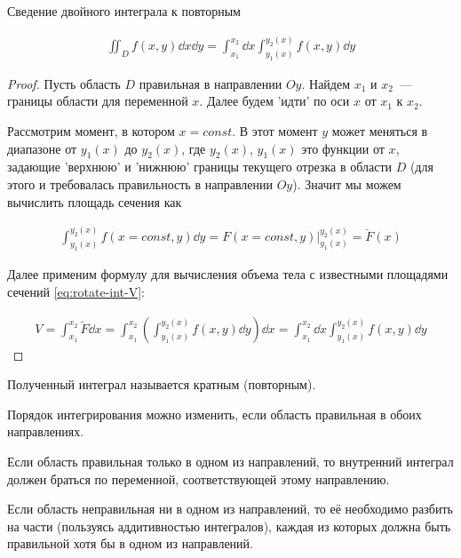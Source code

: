 
\begin{theorem}\label{iint-to-rep}
  Сведение двойного интеграла к повторным

  \begin{align*}
    \iint_{D} f(x, y) \dd x \dd y =
      \int_{x_{1}}^{x_{2}} \dd x \int_{y_{1}(x)}^{y_{2}(x)} f(x, y) \dd y
  \end{align*}
\end{theorem}
\begin{proof}
  Пусть область \(D\) правильная в направлении \(Oy\).
  Найдем \(x_{1}\) и \(x_{2}\)~--- границы области для переменной \(x\).
  Далее будем 'идти' по оси \(x\) от \(x_{1}\) к \(x_{2}\).

  Рассмотрим момент, в котором \(x = const\). В этот момент \(y\) может
  меняться в диапазоне от \(y_{1}(x)\) до \(y_{2}(x)\), где \(y_{2}(x)\),
  \(y_{1}(x)\) это функции от \(x\), задающие 'верхнюю' и 'нижнюю' границы
  текущего отрезка в области \(D\) (для этого и требовалась правильность в
  направлении \(Oy\)). Значит мы можем вычислить площадь сечения как
  
  \begin{align*}
    \int_{y_{1}(x)}^{y_{2}(x)} f(x = const, y) \dd y
    = F(x = const, y) \bigg\vert_{y_{1}(x)}^{y_{2}(x)}
    = \breve{F}(x)
  \end{align*}

  Далее применим формулу для вычисления объема тела с известными площадями
  сечений \eqref{eq:rotate-int-V}:

  \begin{align*}
    V
    = \int_{x_{1}}^{x_{2}} \breve{F} \dd x
    = \int_{x_{1}}^{x_{2}} \left(
      \int_{y_{1}(x)}^{y_{2}(x)} f(x, y) \dd y
    \right) \dd x
    = \int_{x_{1}}^{x_{2}} \dd x \int_{y_{1}(x)}^{y_{2}(x)} f(x, y) \dd y
  \end{align*}
\end{proof}

\begin{remark}
  Полученный интеграл называется кратным (повторным).
\end{remark}

\begin{remark}
  Порядок интегрирования можно изменить, если область правильная в обоих
  направлениях.
  
  Если область правильная только в одном из направлений, то
  внутренний интеграл должен браться по переменной, соответствующей этому
  направлению.

  Если область неправильная ни в одном из направлений, то её необходимо разбить
  на части (пользуясь аддитивностью интегралов), каждая из которых должна быть
  правильной хотя бы в одном из направлений.
\end{remark}